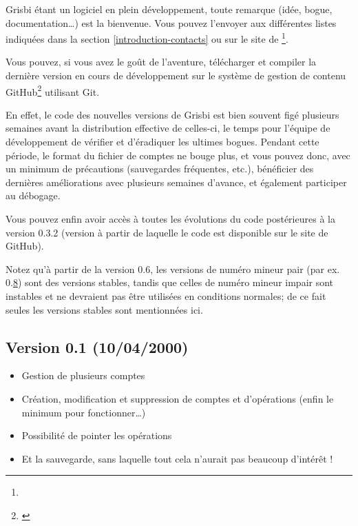 Grisbi étant un logiciel en plein développement, toute remarque (idée, bogue, documentation\dots{}) est la bienvenue. Vous pouvez l'envoyer aux différentes listes indiquées dans la section \vref{introduction-contacts}  ou sur le site de \footnote{\urlGrisbi{}}.

Vous pouvez, si vous avez le goût de l'aventure, télécharger et compiler la dernière version en cours de développement sur le système de gestion de contenu \gls{GitHub}\footnote{\urlGitHubGrisbi{}\label{siteGitHubGrisbi}} utilisant \gls{Git}.

En effet, le code des nouvelles versions de Grisbi est bien souvent figé plusieurs semaines avant la distribution effective de celles-ci, le temps pour l'équipe de développement de vérifier et d'éradiquer les ultimes bogues. Pendant cette période, le format du fichier de comptes ne bouge plus, et vous pouvez donc, avec un minimum de précautions (sauvegardes fréquentes, etc.), bénéficier des dernières améliorations avec plusieurs semaines d'avance, et également participer au débogage.

Vous pouvez enfin avoir accès à toutes les évolutions du code postérieures à la version 0.3.2 (version à partir de laquelle le code est disponible sur le site de \gls{GitHub}).

Notez qu'à partir de la version 0.6, les versions de numéro mineur pair (par ex. 0.\underline8) sont des versions stables, tandis que celles de numéro mineur impair sont instables et ne devraient pas être utilisées en conditions normales; de ce fait seules les versions stables sont mentionnées ici.


\subsection{Version 0.1 \textnormal{(10/04/2000)}}

\begin{itemize}
	\item Gestion de plusieurs comptes
	\item Création, modification et suppression de comptes et d'opérations (enfin le minimum pour fonctionner\dots{})
	\item Possibilité de pointer les opérations
	\item Et la sauvegarde, sans laquelle tout cela n'aurait pas beaucoup d'intérêt !
\end{itemize}


